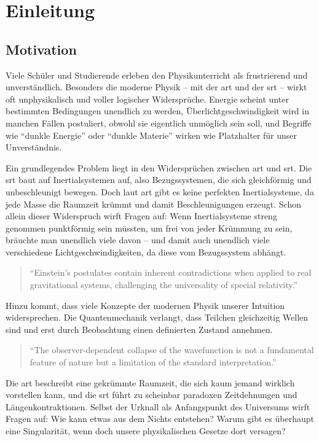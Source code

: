 \chapter{Einleitung}
\section{Motivation}
Viele Schüler und Studierende erleben den Physikunterricht als frustrierend und unverständlich. Besonders die moderne Physik – mit der \gls{art}
und der \gls{srt} – wirkt oft unphysikalisch und voller logischer Widersprüche. Energie scheint unter bestimmten Bedingungen unendlich zu werden,
Überlichtgeschwindigkeit wird in manchen Fällen postuliert, obwohl sie eigentlich unmöglich sein soll, und Begriffe wie \enquote{dunkle Energie} oder \enquote{dunkle Materie} wirken wie
Platzhalter für unser Unverständnis.

Ein grundlegendes Problem liegt in den Widersprüchen zwischen \gls{art} und \gls{srt}. Die \gls{srt} baut auf Inertialsystemen auf, also Bezugssystemen, die sich gleichförmig und unbeschleunigt
bewegen. Doch laut \gls{art} gibt es keine perfekten Inertialsysteme, da jede Masse die Raumzeit krümmt und damit Beschleunigungen erzeugt. Schon allein dieser Widerspruch wirft
Fragen auf: Wenn Inertialsysteme streng genommen punktförmig sein müssten, um frei von jeder Krümmung zu sein, bräuchte man unendlich viele davon – und damit auch unendlich
viele verschiedene Lichtgeschwindigkeiten, da diese vom Bezugssystem abhängt.
\begin{quote}
    \enquote{Einstein's postulates contain inherent contradictions when applied to real gravitational systems, challenging the universality of special relativity.} \cite{Rubcic1998}
\end{quote}
Hinzu kommt, dass viele Konzepte der modernen Physik unserer Intuition widersprechen. Die Quantenmechanik verlangt, dass Teilchen gleichzeitig Wellen sind und erst durch
Beobachtung einen definierten Zustand annehmen.
\begin{quote}
    \enquote{The observer-dependent collapse of the wavefunction is not a fundamental feature of nature but a limitation of the standard interpretation.} \cite{bohm1952}
\end{quote}
Die \gls{art} beschreibt eine gekrümmte Raumzeit, die sich kaum jemand wirklich vorstellen kann, und die \gls{srt} führt zu scheinbar
paradoxen Zeitdehnungen und Längenkontraktionen. Selbst der Urknall als Anfangspunkt des Universums wirft Fragen auf: Wie kann etwas aus dem Nichts entstehen? Warum gibt es
überhaupt eine Singularität, wenn doch unsere physikalischen Gesetze dort versagen?


